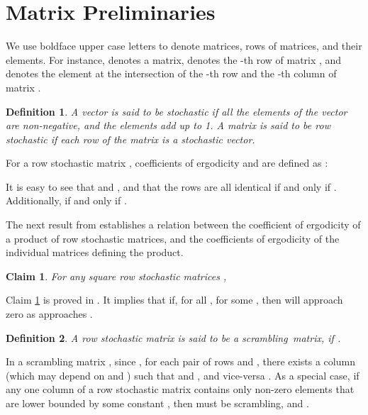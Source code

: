 \documentclass[letterpaper, 12pt]{article}
\newtheorem{claim}{Claim}
\newtheorem{definition}{Definition}
\begin{document}
\section{Matrix Preliminaries}

We use boldface upper case letters to denote matrices,
rows of matrices, and their elements. For instance,
 denotes a matrix,  denotes the -th row of
matrix , and  denotes the element at the
intersection of the -th row and the -th column
of matrix .

\begin{definition}
\label{d_stochastic}
A vector is said to be {\em stochastic} if all the elements
of the vector are {\em non-negative}, and the elements add up to 1.
A matrix is said to be row stochastic if each row of the matrix is a
stochastic vector.
\end{definition}

For a row stochastic matrix ,
 coefficients of ergodicity  and  are defined as
\cite{Wolfowitz}:

It  is easy to see that   and , and that the rows are all identical if and only if . Additionally,  if and only if .


The next result from \cite{Hajnal58} establishes a relation between the coefficient of ergodicity  of a product of row stochastic matrices, and the coefficients of ergodicity  of the individual matrices defining the product. 

\begin{claim}
\label{claim_delta}
For any  square row stochastic matrices , 

\end{claim}
Claim \ref{claim_delta} is proved in \cite{Hajnal58}. It implies that
if, for all ,  for some , then  will approach zero as  approaches . 


\begin{definition}
A row stochastic
 matrix  is said to be a {\em scrambling}\, matrix, if 
{\normalfont \cite{Hajnal58,Wolfowitz}}.
\end{definition}

In a scrambling matrix , since , for each pair of
rows  and , there exists a column  (which may depend on
 and ) such that
  and , and vice-versa \cite{Hajnal58,Wolfowitz}.
As a special case, if any one column of a row stochastic matrix 
contains only non-zero elements that are lower bounded by some
constant , then  must be scrambling, and . 
\end{document}
